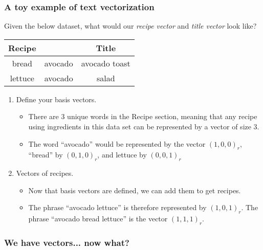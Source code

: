 \documentclass{beamer}
\begin{document}
\begin{frame}
	\frametitle{A toy example of text vectorization}
	Given the below dataset, what would our \textit{recipe vector} and \textit{title vector} look like?
	\begin{center}
		\begin{tabular}{ |c c | c|}
			\hline
			Recipe & & Title \\
			\hline\hline
			bread & avocado & avocado toast \\
			\hline
			lettuce & avocado & salad \\		
			\hline
		\end{tabular}
	\end{center}

	\begin{enumerate}
	
		\item Define your basis vectors.
		\begin{itemize}
			\item There are 3 unique words in the Recipe section,
				meaning that any recipe using ingredients in
				this data set can be represented by a vector of
				size 3.
			\item The word ``avocado'' would be represented by the vector $(1,0,0)_r$, 
				``bread'' by $(0,1,0)_r$, and lettuce by $(0,0,1)_r$
		\end{itemize}
		\item Vectors of recipes.
		\begin{itemize}
			\item Now that basis vectors are defined, we can add them to get recipes.
			\item The phrase ``avocado lettuce'' is therefore represented by $(1,0,1)_r$.
			\itme The phrase ``avocado bread lettuce'' is the vector $(1,1,1)_r$.
		\end{itemize}

	\end{enumerate}
\end{frame}

\begin{frame}
	\frametitle{We have vectors... now what?}

\end{frame}
\end{document}
